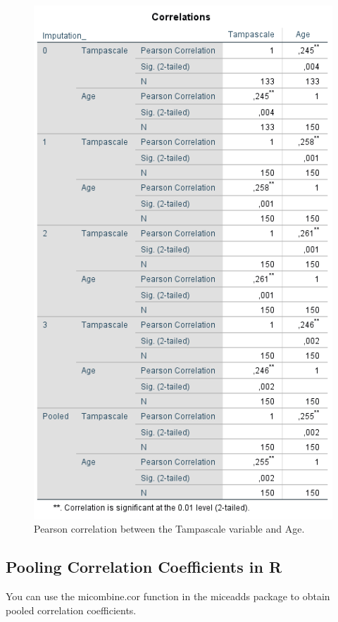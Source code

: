\documentclass[]{book}
\begin{document}
\begin{figure}

{\centering \includegraphics[width=0.9\linewidth]{images/table5.4} 

}

\caption{Pearson correlation between the Tampascale variable and Age.}\label{fig:tab5-4}
\end{figure}

\subsection{Pooling Correlation Coefficients in
R}\label{pooling-correlation-coefficients-in-r}

You can use the micombine.cor function in the miceadds package to obtain
pooled correlation coefficients.
\end{document}
